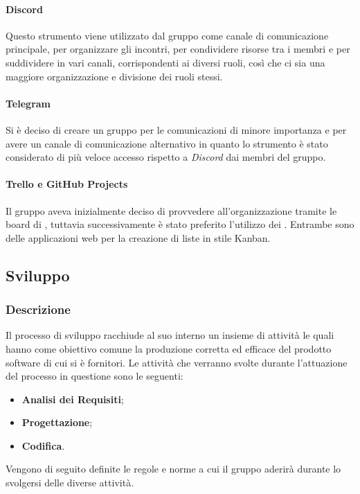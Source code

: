 \paragraph{Discord}

Questo strumento viene utilizzato dal gruppo come canale di comunicazione principale, per organizzare gli incontri, per 
condividere risorse tra i membri e per suddividere in vari canali, corrispondenti ai diversi ruoli, così che ci sia una 
maggiore organizzazione e divisione dei ruoli stessi.

\paragraph{Telegram}

Si è deciso di creare un gruppo  per le comunicazioni di minore importanza e per avere un canale di 
comunicazione alternativo in quanto lo strumento è stato considerato di più veloce accesso rispetto a \emph{Discord} 
dai membri del gruppo.

\paragraph{Trello e GitHub Projects}

Il gruppo aveva inizialmente deciso di provvedere all'organizzazione tramite le board di , tuttavia 
successivamente è stato preferito l'utilizzo dei . Entrambe sono delle applicazioni web per 
la creazione di liste in stile Kanban.

\subsection{Sviluppo}
\label{sub:sviluppo}

\subsubsection{Descrizione}
\label{ssub:sviluppo:descrizione}

Il processo di sviluppo racchiude al suo interno un insieme di attività le quali hanno come obiettivo comune la produzione corretta ed 
efficace del prodotto software di cui si è fornitori. Le attività che verranno svolte durante l'attuazione del processo in questione sono 
le seguenti: 
\begin{itemize}
	\item \textbf{Analisi dei Requisiti};
	\item \textbf{Progettazione};
	\item \textbf{Codifica}.
\end{itemize}
Vengono di seguito definite le regole e norme a cui il gruppo aderirà durante lo svolgersi delle diverse attività.

